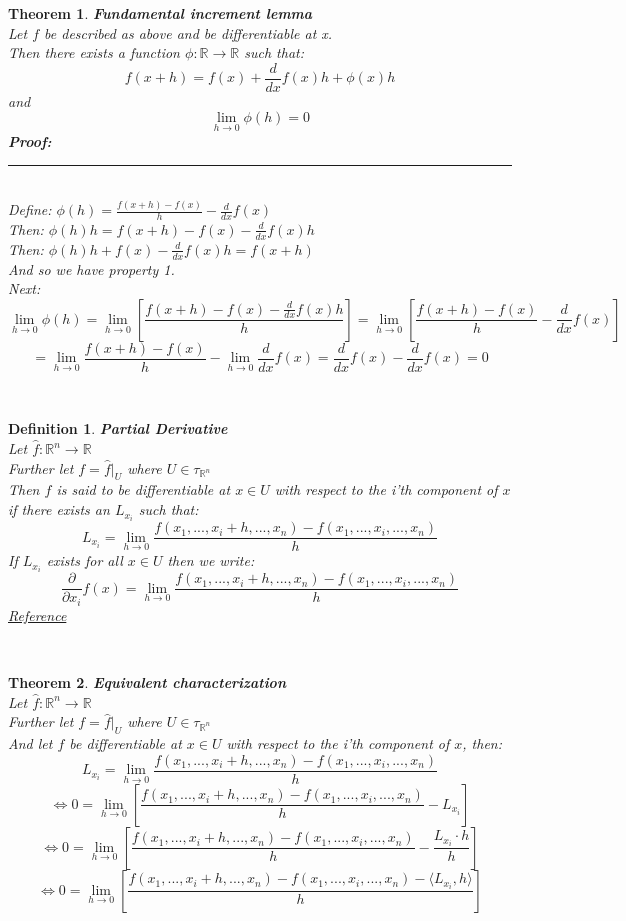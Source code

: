 \documentclass[12pt]{extarticle}
\theoremstyle{plain}
\newtheorem{thm}{Theorem}[section]
\theoremstyle{plain}
\theoremstyle{plain}
\theoremstyle{Definition}
\newtheorem{def.}{Definition}[section]
\theoremstyle{Definition}
\theoremstyle{plain}
\newcommand{\cut}[0]{\noindent\framebox[\linewidth]{\rule{\linewidth}{2pt}}\\}
\newcommand{\prof}[0]{	\noindent \textbf{Proof:} \rule{500pt}{2pt} \\ }
\begin{document}
\begin{thm} \textbf{Fundamental increment lemma} \\ 
	Let $f$ be described as above and be differentiable at x. \\ 
	Then there exists a function $\phi : \mathbb{R} \to \mathbb{R}$ such that: \\ 
	$$f(x + h) = f(x) + \frac{d}{dx} f(x)h + \phi(x)h$$
	and 
	$$\lim_{h \to 0} \phi(h) = 0$$ 
	\prof 
	Define: $\phi(h) = \frac{f(x+h) - f(x)}{h} - \frac{d}{dx} f(x)$ \\ 
	Then: $\phi(h)h = f(x+h) - f(x) - \frac{d}{dx} f(x)h$ \\ 
	Then: $\phi(h)h + f(x) - \frac{d}{dx} f(x)h = f(x + h)$ \\ 
	And so we have property 1. \\ 
	Next: \\ 
	$$\lim_{h \to 0} \phi(h) = \lim_{h \to 0} \left[\frac{f(x+h) - f(x) - \frac{d}{dx} f(x)h}{h}\right] = \lim_{h \to 0} \left[\frac{f(x+h) - f(x)}{h} - \frac{d}{dx} f(x)\right] $$
	$$= \lim_{h \to 0}\frac{f(x+h) - f(x)}{h} - \lim_{h \to 0} \frac{d}{dx} f(x) = \frac{d}{dx} f(x) - \frac{d}{dx} f(x) = 0$$
\end{thm}
\cut
\begin{def.} \textbf{Partial Derivative} \\
	Let $\hat{f} : \mathbb{R}^n \to \mathbb{R}$ \\
	Further let $f = \hat{f}|_U$ where $U \in \tau_{\mathbb{R}^n}$ \\ 
	Then $f$ is said to be differentiable at $x \in U$ with respect to the i'th component of $x$ if there exists an $L_{x_i}$ such that: \\  
	$$L_{x_i} = \lim_{h \to 0} \frac{f(x_1,...,x_i + h,...,x_n) - f(x_1,...,x_i,...,x_n)}{h}$$
	If $L_{x_i}$ exists for all $x \in U$ then we write: \\ 
	$$\frac{\partial}{\partial x_i} f(x) = \lim_{h \to 0} \frac{f(x_1,...,x_i + h,...,x_n) - f(x_1,...,x_i,...,x_n)}{h}$$ 
	\href{https://en.wikipedia.org/wiki/Partial_derivative}{Reference}
\end{def.}
\cut
\begin{thm} \textbf{Equivalent characterization} \\ 
	Let $\hat{f} : \mathbb{R}^n \to \mathbb{R}$ \\
	Further let $f = \hat{f}|_U$ where $U \in \tau_{\mathbb{R}^n}$ \\ 
	And let $f$ be differentiable at $x \in U$ with respect to the i'th component of $x$, then: 
	$$L_{x_i} = \lim_{h \to 0} \frac{f(x_1,...,x_i + h,...,x_n) - f(x_1,...,x_i,...,x_n)}{h}$$
	$$\Leftrightarrow 0 = \lim_{h \to 0} \left[\frac{f(x_1,...,x_i + h,...,x_n) - f(x_1,...,x_i,...,x_n)}{h} - L_{x_i}\right]$$
	$$\Leftrightarrow 0 = \lim_{h \to 0} \left[\frac{f(x_1,...,x_i + h,...,x_n) - f(x_1,...,x_i,...,x_n)}{h} - \frac{L_{x_i} \cdot h}{h}\right]$$
	$$\Leftrightarrow 0 = \lim_{h \to 0} \left[\frac{f(x_1,...,x_i + h,...,x_n) - f(x_1,...,x_i,...,x_n) - \langle L_{x_i} , h \rangle}{h}  \right]$$	
\end{thm}
\end{document}
